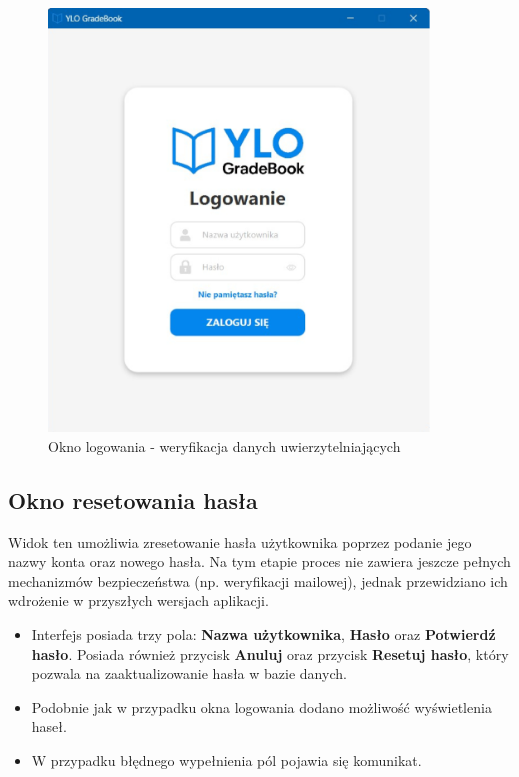 \begin{figure}[H]
    \centering
    \includegraphics[width=0.9\textwidth]{figures/fig_0005.eps}
    \caption{Okno logowania - weryfikacja danych uwierzytelniających}
    \label{fig:loginView}
\end{figure}
\newpage
\subsection{Okno resetowania hasła}
Widok ten umożliwia zresetowanie hasła użytkownika poprzez podanie jego nazwy konta oraz nowego hasła. Na tym etapie proces nie zawiera jeszcze pełnych mechanizmów bezpieczeństwa (np. weryfikacji mailowej), jednak przewidziano ich wdrożenie w przyszłych wersjach aplikacji.

\begin{itemize}
    \item Interfejs posiada trzy pola: \textbf{Nazwa użytkownika}, \textbf{Hasło} oraz \textbf{Potwierdź hasło}. Posiada również przycisk \textbf{Anuluj} oraz przycisk \textbf{Resetuj hasło}, który pozwala na zaaktualizowanie hasła w bazie danych.
    \item Podobnie jak w przypadku okna logowania dodano możliwość wyświetlenia haseł.
    \item W przypadku błędnego wypełnienia pól pojawia się komunikat.
\end{itemize}

